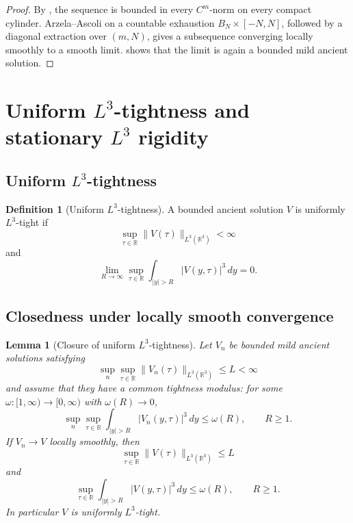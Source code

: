 \documentclass[11pt]{amsart}
\theoremstyle{plain}
\newtheorem{lemma}[theorem]{Lemma}
\theoremstyle{definition}
\newtheorem{definition}[theorem]{Definition}
\theoremstyle{remark}
\numberwithin{equation}{section}
\newcommand{\R}{\mathbb R}
\begin{document}
\begin{proof}
By , the sequence is bounded in every
\(C^m\)-norm on every compact cylinder.  Arzela--Ascoli on a countable
exhaustion \(B_N\times[-N,N]\), followed by a diagonal extraction over
\((m,N)\), gives a subsequence converging locally smoothly to a smooth limit.
 shows that the limit is again a bounded mild ancient
solution.
\end{proof}

\section{\texorpdfstring{Uniform \(L^3\)-tightness and stationary \(L^3\) rigidity}{Uniform L3-tightness and stationary L3 rigidity}}
\label{sec:tightness-rigidity}

\subsection{\texorpdfstring{Uniform \(L^3\)-tightness}{Uniform L3-tightness}}

\begin{definition}[Uniform \(L^3\)-tightness]\label{def:L3-tight}
A bounded ancient solution \(V\) is uniformly \(L^3\)-tight if
\[
   \sup_{\tau\in\R}\|V(\tau)\|_{L^3(\R^3)}<\infty
\]
and
\[
   \lim_{R\to\infty}
   \sup_{\tau\in\R}
   \int_{|y|>R}|V(y,\tau)|^3\,dy=0 .
\]
\end{definition}

\subsection{Closedness under locally smooth convergence}

\begin{lemma}[Closure of uniform \(L^3\)-tightness]\label{lem:tight-closure}
Let \(V_n\) be bounded mild ancient solutions satisfying
\[
   \sup_n\sup_{\tau\in\R}\|V_n(\tau)\|_{L^3(\R^3)}\le L<\infty
\]
and assume that they have a common tightness modulus: for some
\(\omega:[1,\infty)\to[0,\infty)\) with \(\omega(R)\to0\),
\[
   \sup_n\sup_{\tau\in\R}
   \int_{|y|>R}|V_n(y,\tau)|^3\,dy\le \omega(R),
   \qquad R\ge1.
\]
If \(V_n\to V\) locally smoothly, then
\[
   \sup_{\tau\in\R}\|V(\tau)\|_{L^3(\R^3)}\le L
\]
and
\[
   \sup_{\tau\in\R}
   \int_{|y|>R}|V(y,\tau)|^3\,dy\le \omega(R),
   \qquad R\ge1.
\]
In particular \(V\) is uniformly \(L^3\)-tight.
\end{lemma}
\end{document}
